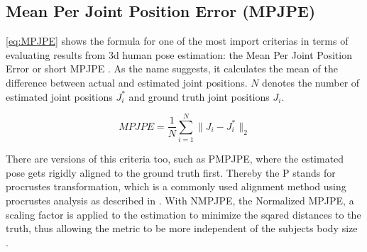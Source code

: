 \subsection{Mean Per Joint Position Error (MPJPE)}
\label{criteria:mpjpe}
\autoref{eq:MPJPE} shows the formula for one of the most import criterias in terms of evaluating results from 3d human pose estimation: the Mean Per Joint Position Error or short MPJPE \cite{Zheng2020}. As the name suggests, it calculates the mean of the difference between actual and estimated joint positions. $N$ denotes the number of estimated joint positions $J_{i}^*$ and ground truth joint positions $J_{i}$. 

\begin{equation}
\label{eq:MPJPE}
MPJPE = \frac{1}{N} \sum_{i=1}^{N} \lVert J_{i} - J_{i}^*\rVert_{2}
\end{equation}

There are versions of this criteria too, such as PMPJPE, where the estimated pose gets rigidly aligned to the ground truth first. Thereby the P stands for procrustes transformation, which is a commonly used alignment method using procrustes analysis as described in \cite{gower1975generalized}.
With NMPJPE, the Normalized MPJPE, a scaling factor is applied to the estimation to minimize the sqared distances to the truth, thus allowing the metric to be more independent of the subjects body size \cite{Rhodin2018}.